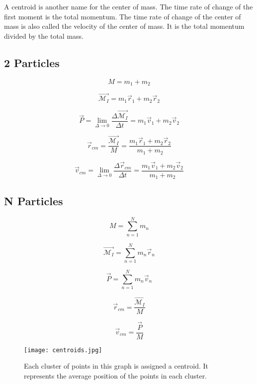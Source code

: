 A centroid is another name for the center of mass.  The time rate of change of the first moment is the total momentum.  The time rate of change of the center of mass is also called the velocity of the center of mass.  It is the total momentum divided by the total mass.

\vspace{1cm}

\begin{fullwidth}
\begin{minipage}{7.5cm}
\subsection{2 Particles}
$$M=m_1+m_2$$

$$\overrightarrow{\mathcal{M}_{I}}=m_1\overrightarrow{r}_1+m_2\overrightarrow{r}_2 $$

$$\overrightarrow{P}=\lim_{\Delta \rightarrow 0}\frac{\Delta \overrightarrow{\mathcal{M}_{I}}}{\Delta t}=m_1\overrightarrow{v}_1+m_2\overrightarrow{v}_2$$

$$\overrightarrow{r}_{cm}=\frac{\overrightarrow{\mathcal{M}_{I}}}{M}=\frac{m_1\overrightarrow{r}_1+m_2\overrightarrow{r}_2}{m_1+m_2}$$

$$\overrightarrow{v}_{cm}=\lim_{\Delta \rightarrow 0}\frac{\Delta \overrightarrow{r}_{cm}}{\Delta t}=\frac{m_1\overrightarrow{v}_1+m_2\overrightarrow{v}_2}{m_1+m_2}$$
\end{minipage}
\begin{minipage}{7.5cm}
\subsection{N Particles}

$$M=\sum^N_{n=1}m_n$$

$$\overrightarrow{\mathcal{M}_{I}}=\sum^N_{n=1}m_n\overrightarrow{r}_n$$

$$\overrightarrow{P}=\sum^N_{n=1} m_n\overrightarrow{v}_n$$


$$\overrightarrow{r}_{cm}=\frac{\overrightarrow{\mathcal{M}_{I}}}{M}$$

$$\overrightarrow{v}_{cm}=\frac{\overrightarrow{P}}{M}$$


\end{minipage}



\end{fullwidth}

\vspace{0.5cm}

\begin{figure}
  \texttt{[image: centroids.jpg]}
  \caption{Each cluster of points in this graph is assigned a centroid.  It represents the average position of the points in each cluster. }
  \label{fig:marginfig}
\end{figure}


